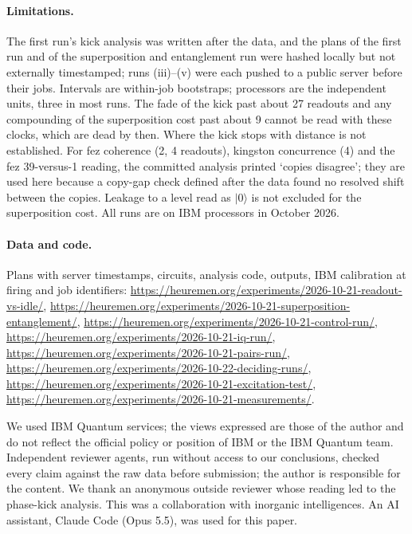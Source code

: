 \documentclass[reprint,amsmath,amssymb,aps,superscriptaddress,nofootinbib]{revtex4-2}
\begin{document}
\paragraph*{Limitations.} The first run's kick analysis was written after the data, and the plans of the first run and of the superposition and entanglement run were hashed locally but not externally timestamped; runs (iii)--(v) were each pushed to a public server before their jobs. Intervals are within-job bootstraps; processors are the independent units, three in most runs. The fade of the kick past about 27 readouts and any compounding of the superposition cost past about 9 cannot be read with these clocks, which are dead by then. Where the kick stops with distance is not established. For fez coherence (2, 4 readouts), kingston concurrence (4) and the fez 39-versus-1 reading, the committed analysis printed `copies disagree'; they are used here because a copy-gap check defined after the data found no resolved shift between the copies. Leakage to a level read as $|0\rangle$ is not excluded for the superposition cost. All runs are on IBM processors in October 2026.

\paragraph*{Data and code.} Plans with server timestamps, circuits, analysis code, outputs, IBM calibration at firing and job identifiers: \url{https://heuremen.org/experiments/2026-10-21-readout-vs-idle/}, \url{https://heuremen.org/experiments/2026-10-21-superposition-entanglement/}, \url{https://heuremen.org/experiments/2026-10-21-control-run/}, \url{https://heuremen.org/experiments/2026-10-21-iq-run/}, \url{https://heuremen.org/experiments/2026-10-21-pairs-run/}, \url{https://heuremen.org/experiments/2026-10-22-deciding-runs/}, \url{https://heuremen.org/experiments/2026-10-21-excitation-test/}, \url{https://heuremen.org/experiments/2026-10-21-measurements/}.

\begin{acknowledgments}
We used IBM Quantum services; the views expressed are those of the author and do not reflect the official policy or position of IBM or the IBM Quantum team. Independent reviewer agents, run without access to our conclusions, checked every claim against the raw data before submission; the author is responsible for the content. We thank an anonymous outside reviewer whose reading led to the phase-kick analysis. This was a collaboration with inorganic intelligences. An AI assistant, Claude Code (Opus 5.5), was used for this paper.
\end{acknowledgments}


\end{document}
